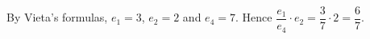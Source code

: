 By Vieta's formulas, \(e_1=3\), \(e_2=2\) and \(e_4=7\). Hence \(\dfrac{e_1}{e_4}\cdot e_2=\dfrac{3}{7}\cdot 2=\boxed{\dfrac{6}{7}}\).
